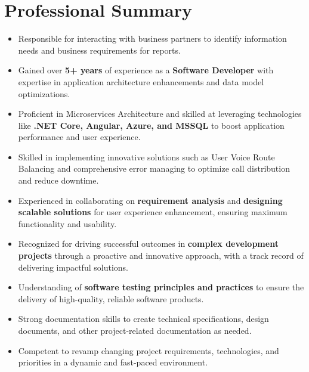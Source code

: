\section{\textbf{Professional Summary}}
\begin{itemize}
    \small
    \setlength{\itemsep}{0pt}
    \setlength{\parskip}{0pt}
    \setlength{\parsep}{0pt}
    \item Responsible for interacting with business partners to identify information needs and
          business requirements for reports.
    \item Gained over \textbf{5+ years} of experience as a \textbf{Software Developer} with expertise in
          application architecture enhancements and data model optimizations.
    \item Proficient in Microservices Architecture and skilled at leveraging technologies like \textbf{.NET Core,
              Angular, Azure, and MSSQL} to boost application performance and user experience.
    \item Skilled in implementing innovative solutions such as User Voice Route Balancing and
          comprehensive error managing to optimize call distribution and reduce downtime.
    \item Experienced in collaborating on \textbf{requirement analysis} and \textbf{designing scalable solutions}
          for user experience enhancement, ensuring maximum functionality and usability.
    \item Recognized for driving successful outcomes in \textbf{complex development projects}
          through a proactive and innovative approach, with a track record of delivering
          impactful solutions.
    \item Understanding of \textbf{software testing principles and practices} to ensure the delivery of
          high-quality, reliable software products.
    \item Strong documentation skills to create technical specifications, design documents, and
          other project-related documentation as needed.
    \item Competent to revamp changing project requirements, technologies, and priorities in
          a dynamic and fast-paced environment.
\end{itemize}